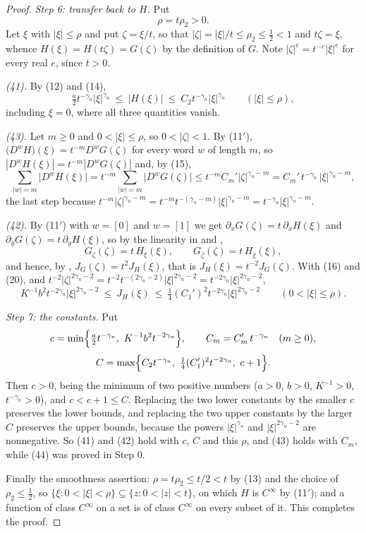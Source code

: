\begin{proof}
\emph{Step 6: transfer back to $H$.}  Put
\[
  \rho=t\rho_2>0 .
\]
Let $\xi$ with $|\xi|\le\rho$ and put $\zeta=\xi/t$, so that
$|\zeta|=|\xi|/t\le\rho_2\le\tfrac12<1$ and $t\zeta=\xi$, whence
$H(\xi)=H(t\zeta)=G(\zeta)$ by the definition of $G$.  Note
$|\zeta|^{e}=t^{-e}|\xi|^{e}$ for every real $e$, since $t>0$.

\emph{(41).}  By (12) and (14),
\[
  \tfrac a2 t^{-\gamma_n}|\xi|^{\gamma_n}\ \le\ |H(\xi)|\ \le\
  C_2t^{-\gamma_n}|\xi|^{\gamma_n}\qquad(|\xi|\le\rho),
\]
including $\xi=0$, where all three quantities vanish.

\emph{(43).}  Let $m\ge0$ and $0<|\xi|\le\rho$, so $0<|\zeta|<1$.  By
(11$'$), $\bigl(D^{w}H\bigr)(\xi)=t^{-m}D^{w}G(\zeta)$ for every word $w$ of
length $m$, so $|D^{w}H(\xi)|=t^{-m}|D^{w}G(\zeta)|$ and, by (15),
\[
  \sum_{|w|=m}\bigl|D^{w}H(\xi)\bigr|
  =t^{-m}\sum_{|w|=m}\bigl|D^{w}G(\zeta)\bigr|
  \le t^{-m}C_m'|\zeta|^{\gamma_n-m}
  =C_m'\,t^{-\gamma_n}\,|\xi|^{\gamma_n-m},
\]
the last step because $t^{-m}|\zeta|^{\gamma_n-m}
=t^{-m}t^{-(\gamma_n-m)}|\xi|^{\gamma_n-m}=t^{-\gamma_n}|\xi|^{\gamma_n-m}$.

\emph{(42).}  By (11$'$) with $w=[0]$ and $w=[1]$ we get
$\partial_xG(\zeta)=t\,\partial_xH(\xi)$ and
$\partial_yG(\zeta)=t\,\partial_yH(\xi)$, so by the linearity in
\noderef{DZ} and \noderef{DZbar},
\[
  G_\zeta(\zeta)=t\,H_\xi(\xi),\qquad G_{\bar\zeta}(\zeta)=t\,H_{\bar\xi}(\xi),
\]
and hence, by , $J_G(\zeta)=t^2J_H(\xi)$, that is
$J_H(\xi)=t^{-2}J_G(\zeta)$.  With (16) and (20), and
$t^{-2}|\zeta|^{2\gamma_n-2}=t^{-2}t^{-(2\gamma_n-2)}|\xi|^{2\gamma_n-2}
=t^{-2\gamma_n}|\xi|^{2\gamma_n-2}$,
\[
  K^{-1}b^2t^{-2\gamma_n}|\xi|^{2\gamma_n-2}\ \le\ J_H(\xi)\ \le\
  \tfrac14(C_1')^2t^{-2\gamma_n}|\xi|^{2\gamma_n-2}\qquad(0<|\xi|\le\rho).
\]

\emph{Step 7: the constants.}  Put
\[
  c=\min\Bigl\{\tfrac a2t^{-\gamma_n},\ K^{-1}b^2t^{-2\gamma_n}\Bigr\},\qquad
  C_m=C_m'\,t^{-\gamma_n}\quad(m\ge0),
\]
\[
  C=\max\Bigl\{C_2t^{-\gamma_n},\ \tfrac14(C_1')^2t^{-2\gamma_n},\ c+1\Bigr\}.
\]
Then $c>0$, being the minimum of two positive numbers ($a>0$, $b>0$,
$K^{-1}>0$, $t^{-\gamma_n}>0$), and $c<c+1\le C$.  Replacing the two lower
constants by the smaller $c$ preserves the lower bounds, and replacing the two
upper constants by the larger $C$ preserves the upper bounds, because the
powers $|\xi|^{\gamma_n}$ and $|\xi|^{2\gamma_n-2}$ are nonnegative.  So (41)
and (42) hold with $c$, $C$ and this $\rho$, and (43) holds with $C_m$, while
(44) was proved in Step 0.

Finally the smoothness assertion: $\rho=t\rho_2\le t/2<t$ by (13) and the
choice of $\rho_2\le\tfrac12$, so
$\{\xi:0<|\xi|<\rho\}\subseteq\{z:0<|z|<t\}$, on which $H$ is $C^\infty$ by
(11$'$); and a function of class $C^\infty$ on a set is of class $C^\infty$ on
every subset of it.  This completes the proof.
\end{proof}
